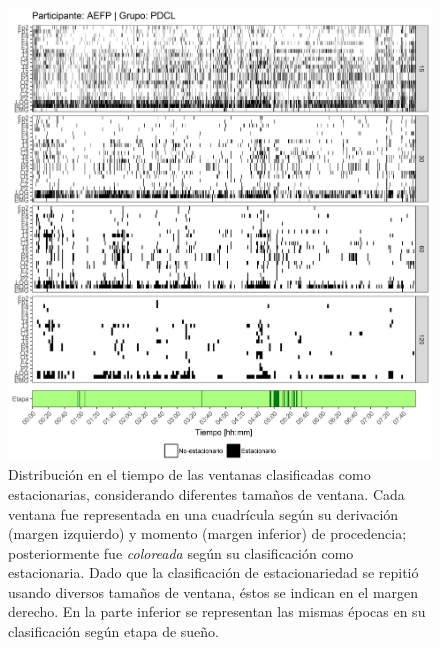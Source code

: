 \documentclass[12pt,letterpaper,draft]{book}
\begin{document}
\begin{figure}
\centering
\includegraphics[width=\linewidth]
{./scripts_graf_res/AEFP_patrones_2.png}
\caption[Distribución en el tiempo de las ventanas clasificadas como estacionarias, considerando diferentes tamaños de ventana]{Distribución en el tiempo de las ventanas clasificadas como estacionarias, considerando diferentes tamaños de ventana. 
Cada ventana fue representada en una cuadrícula según su derivación (margen izquierdo) y momento (margen inferior) de procedencia; posteriormente fue \textit{coloreada} según su clasificación como estacionaria.
Dado que la clasificación de estacionariedad se repitió usando diversos tamaños de ventana, éstos se indican en el margen derecho.
En la parte inferior se representan las mismas épocas en su clasificación según etapa de sueño.}
\end{figure}
\end{document}
